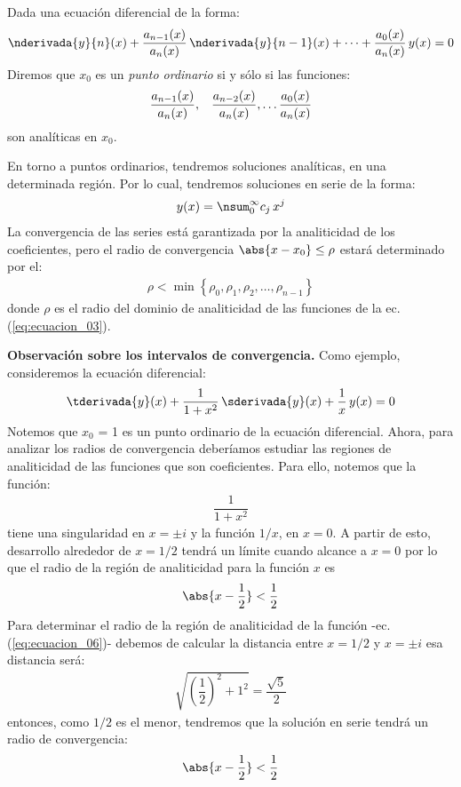Dada una ecuación diferencial de la forma:
\begin{align*}
\nderivada{y}{n} (x) + \dfrac{a_{n-1} (x)}{a_{n} (x)} \, \nderivada{y}{n-1} (x)+ \cdots + \dfrac{a_{0} (x)}{a_{n} (x)} \, y(x) = 0
\end{align*}
Diremos que $x_{0}$ es un \emph{punto ordinario} si y sólo si las funciones:
\begin{align}
\dfrac{a_{n-1} (x)}{a_{n} (x)}, \hspace{0.3cm} \dfrac{a_{n-2} (x)}{a_{n} (x)}, \ldots \dfrac{a_{0} (x)}{a_{n} (x)}
\label{eq:ecuacion_03}
\end{align}
son analíticas en $x_{0}$.
\par
En torno a puntos ordinarios, tendremos soluciones analíticas, en una determinada región. Por lo cual, tendremos soluciones en serie de la forma:
\begin{align}
y (x) = \nsum_{0}^{\infty} c_{j} \, x^{j}
\label{eq:ecuacion_04}
\end{align}                                
La convergencia de las series está garantizada por la analiticidad de los coeficientes, pero el radio de convergencia $\abs{x - x_{0}} \leq \rho$ estará determinado por el:
\begin{align}
\rho < \min \left\{ \rho_{0}, \rho_{1}, \rho_{2}, \ldots, \rho_{n-1} \right\}
\label{eq:ecuacion_05}
\end{align}
donde $\rho$ es el radio del dominio de analiticidad de las funciones de la ec. (\ref{eq:ecuacion_03}).
\par
\noindent
\textbf{Observación sobre los intervalos de convergencia.} Como ejemplo, consideremos la ecuación diferencial:
\begin{align*}
\tderivada{y} (x) + \dfrac{1}{1 + x^{2}} \, \sderivada{y} (x) + \dfrac{1}{x} \, y (x) = 0
\end{align*}
Notemos que $x_{0}$ = 1 es un punto ordinario de la ecuación diferencial. Ahora, para analizar los radios de convergencia deberíamos estudiar las regiones de analiticidad de las funciones que son coeficientes. Para ello, notemos que la función:
\begin{align}
\dfrac{1}{1 + x^{2}}
\label{eq:ecuacion_06}
\end{align}
tiene una singularidad en $x = \pm i$ y la función $1/x$, en $x = 0$. A partir de esto, desarrollo alrededor de $x = 1/2$ tendrá un límite cuando alcance a $x = 0$ por lo que el radio de la región de analiticidad para la función $x$ es
\begin{align*}
\abs{x - \dfrac{1}{2}} < \dfrac{1}{2}
\end{align*}
Para determinar el radio de la región de analiticidad de la función -ec. (\ref{eq:ecuacion_06})- debemos de calcular la distancia entre $x = 1/2$ y $x = \pm i$ esa distancia será:
\begin{align*}
\sqrt{\left( \dfrac{1}{2} \right)^{2} +  1^{2}} = \dfrac{\sqrt{5}}{2}
\end{align*}
entonces, como $1/2$ es el menor, tendremos que la solución en serie tendrá un radio de convergencia:
\begin{align*}
\abs{x - \dfrac{1}{2}} < \dfrac{1}{2}
\end{align*}

